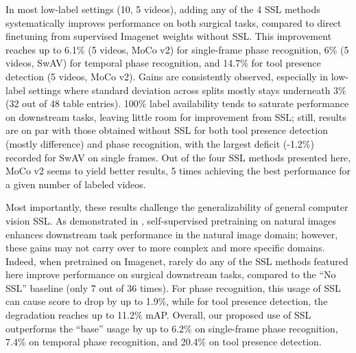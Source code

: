 \documentclass[times,twocolumn,final]{elsarticle}
\begin{document}
{\color{changetext} In most low-label settings (10, 5 videos), adding any of the 4 SSL methods systematically improves performance on both surgical tasks, compared to direct finetuning from supervised Imagenet weights without SSL. This improvement reaches up to 6.1\% (5 videos, MoCo v2) for single-frame phase recognition, 6\% (5 videos, SwAV) for temporal phase recognition, and 14.7\% for tool presence detection (5 videos, MoCo v2). Gains are consistently observed, especially in low-label settings where standard deviation across splits mostly stays underneath 3\% (32 out of 48 table entries). 100\% label availability tends to saturate performance on downstream tasks, leaving little room for improvement from SSL; still, results are on par with those obtained without SSL for both tool presence detection (mostly  difference) and phase recognition, with the largest deficit (-1.2\%) recorded for SwAV on single frames. Out of the four SSL methods presented here, MoCo v2 seems to yield better results, 5 times achieving the best performance for a given number of labeled videos.

Most importantly, these results challenge the generalizability of general computer vision SSL. As demonstrated in \cite{oord2018representation, he2020momentum, chen2020improved, caron2021emerging}, self-supervised pretraining on natural images enhances downstream task performance in the natural image domain; however, these gains may not carry over to more complex and more specific domains. Indeed, when pretrained on Imagenet, rarely do any of the SSL methods featured here improve performance on surgical downstream tasks, compared to the ``No SSL'' baseline (only 7 out of 36 times). For phase recognition, this usage of SSL can cause  score to drop by up to 1.9\%, while for tool presence detection, the degradation reaches up to 11.2\% mAP. Overall, our proposed use of SSL outperforms the ``base'' usage by up to 6.2\% on single-frame phase recognition, 7.4\% on temporal phase recognition, and 20.4\% on tool presence detection.}
\end{document}
